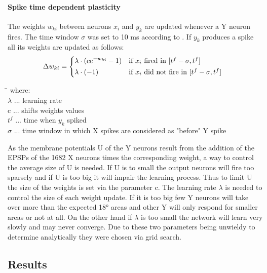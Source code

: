 \paragraph{Spike time dependent plasticity}
The weights $w_{ki}$ between neurons $x_i$ and $y_k$ are updated whenever a Y neuron fires. The time window $\sigma$ was set to 10 ms according to \citet{nessler}. If $y_k$ produces a spike all its weights are updated as follows:
\begin{equation}
\label{deltawki}
\Delta w_{ki} = \begin{dcases*} \lambda \cdot (ce^{-w_{ki}} - 1) & if $x_{i}$ fired in $ [t^f - \sigma, t^f] $ \\
\lambda \cdot (-1) & \text{if $ x_i $ did not fire in $ [t^f - \sigma, t^f] $ } \end{dcases*}
\end{equation}
\begin{tabbing}
\phantom{$c\ $}\= \kill
where:\> \\
$\lambda$\> ... learning rate \\
c\> ... shifts weights values \\
$t^f$\> ... time when $y_k$ spiked \\
$\sigma$ ... time window in which X spikes are considered as "before" Y spike
\end{tabbing}
As the membrane potentials U of the Y neurons result from the addition of the EPSPs of the 1682 X neurons times the corresponding weight, a way to control the average size of U is needed. If U is to small the output neurons will fire too sparsely and if U is too big it will impair the learning process. Thus to limit U the size of the weights is set via the parameter c. The learning rate $\lambda$ is needed to control the size of each weight update. If it is too big few Y neurons will take over more than the expected 18° areas and other Y will only respond for smaller areas or not at all. On the other hand if $\lambda$ is too small the network will learn very slowly and may never converge. Due to these two parameters being unwieldy to determine analytically they were chosen via grid search. 


\subsection{Results}

